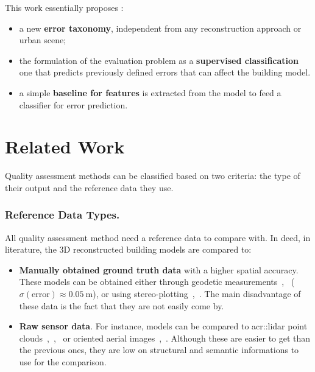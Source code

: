 \documentclass[runningheads]{llncs}
\begin{document}
	This work essentially proposes :
	\begin{itemize}
		\item a new \textbf{error taxonomy}, independent from any reconstruction approach or urban scene;
		\item the formulation of the evaluation problem as a \textbf{supervised classification} one that predicts previously defined errors that can affect the building model.
		\item a simple \textbf{baseline for features} is extracted from the model to feed a classifier for error prediction.
	\end{itemize}
\section{Related Work}

Quality assessment methods can be classified based on two criteria: the type of their output and the reference data they use.
\subsubsection{Reference Data Types.}
All quality assessment method need a reference data to compare with. In deed, in literature, the 3D reconstructed building models are compared to:
\begin{itemize}
	\item \textbf{Manually obtained ground truth data} with a higher spatial accuracy. These models can be obtained either through geodetic measurements~\cite{Kaartinen2005},~\cite{Voegtle2003} ($\sigma(\text{error}) \approx \SI{0.05}{\meter}$), or using stereo-plotting~\cite{Kaartinen2005},~\cite{Zeng2014}. The main disadvantage of these data is the fact that they are not easily come by.
	\item \textbf{Raw sensor data}. For instance, models can be compared to \acrfull{acr::lidar} point clouds~\cite{Akca2010},~\cite{Lafarge2012},~\cite{li2016boxfitting} or oriented aerial images~\cite{boudet2006supervised},~\cite{Michelin2013}. Although these are easier to get than the previous ones, they are low on structural and semantic informations to use for the comparison.
\end{itemize}
\end{document}
